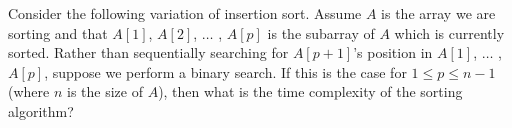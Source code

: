 Consider the following variation of insertion sort.  Assume $A$ is the array
we are sorting and that $A[1]$, $A[2]$, $\ldots$  , $A[p]$ is the subarray of
$A$ which is currently sorted.  Rather than sequentially searching for
$A[p+1]$'s position in $A[1]$,  $\ldots$  , $A[p]$, suppose we perform a binary
search.  If this is the case for $1\leq  p \leq  n-1$ (where $n$ is the size of
$A$), then what is the time complexity of the sorting algorithm?
